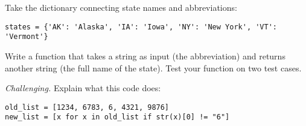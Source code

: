 \documentclass[11pt]{exam}
\begin{document}
\begin{questions}
\item %
Take the dictionary connecting state names and abbreviations:
\begin{verbatim}
states = {'AK': 'Alaska', 'IA': 'Iowa', 'NY': 'New York', 'VT': 'Vermont'}
\end{verbatim}
Write a function that takes a string as input (the abbreviation)
and returns another string (the full name of the state).
Test your function on two test cases.

\item {\it Challenging.\/}
 Explain what this code does:
\begin{verbatim}
old_list = [1234, 6783, 6, 4321, 9876]
new_list = [x for x in old_list if str(x)[0] != "6"]
\end{verbatim} 

\end{questions}
\end{document}
